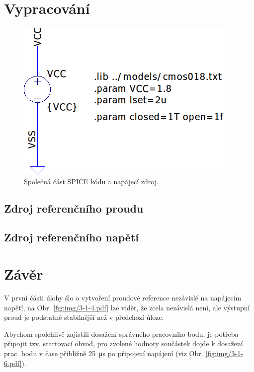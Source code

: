 \documentclass{protokol}
\begin{document}
	\maketitle

\section{Vypracování}
\begin{figure}[h!]
  \centering
  \includegraphics[scale=0.5]{spice0.png}
  \caption{Společná část SPICE kódu a napájecí zdroj.}
  \label{fig:spice0-png}
\end{figure}
 
\subsection{Zdroj referenčního proudu}



  \clearpage
\subsection{Zdroj referenčního napětí }


\clearpage
\section{Závěr}
  V první části úlohy šlo o vytvoření proudové reference nezávislé na napájecím napětí, na Obr. \ref{fig:img/3-1-4.pdf} lze vidět, že zcela nezávislá není, ale výstupní proud je podstatně stabilnější než v předchozí úloze. 

  Abychom spolehlivě zajistili dosažení správného pracovního bodu, je potřeba připojit tzv. startovací obvod, pro zvolené hodnoty součástek dojde k dosažení prac. bodu v čase přibližně \qty{25}{\micro\second} po připojení napájení (viz Obr. \ref{fig:img/3-1-6.pdf}). 
\end{document}

